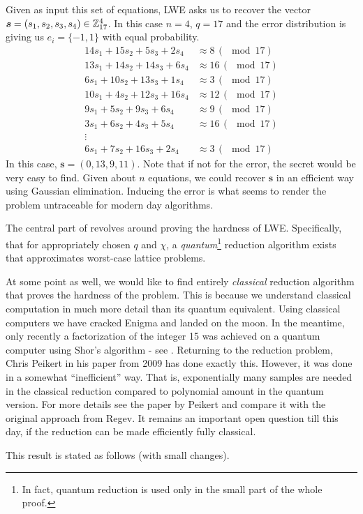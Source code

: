 \begin{example}\label{lwe_ex}
    Given as input this set of equations, LWE asks us to recover the vector $\boldsymbol{s} = (s_1, s_2, s_3, s_4) \in \mathbb{Z}_{17}^4$. In this case $n = 4$, $q=17$ and the error distribution is giving us $e_i = \{-1, 1\}$ with equal probability. 
\begin{align*}
    14s_1 + 15s_2 +5s_3 + 2s_4 & \approx 8 \, (\mod 17)\\
    13s_1 + 14s_2 + 14s_3 + 6s_4 & \approx 16\, (\mod 17) \\
    6s_1 + 10s_2 + 13s_3 + 1s_4 & \approx 3\, (\mod 17) \\
    10s_1 + 4s_2 + 12s_3 + 16s_4 & \approx 12\, (\mod 17) \\
    9s_1 + 5s_2 + 9s_3 +6s_4 & \approx 9\, (\mod 17) \\
    3s_1 + 6s_2 +4s_3 +5s_4 & \approx 16\, (\mod 17) \\
    \vdots & \\
    6s_1 + 7s_2 + 16s_3 + 2s_4 & \approx 3\, (\mod 17)
\end{align*}
In this case, $\bm{s} = (0, 13, 9, 11)$. Note that if not for the error, the secret would be very easy to find. Given about $n$ equations, we could recover $\bm{s}$ in an efficient way using Gaussian elimination. Inducing the error is what seems to render the problem untraceable for modern day algorithms.
\end{example}

The central part of \cite{regev} revolves around proving the hardness of LWE. Specifically, that for appropriately chosen $q$ and $\chi$, a \textit{quantum}\footnote{In fact, quantum reduction is used only in the small part of the whole proof.} reduction algorithm exists that approximates worst-case lattice problems. 
\\ 
\begin{remark}
    At some point as well, we would like to find entirely \textit{classical} reduction algorithm that proves the hardness of the problem. This is because we understand classical computation in much more detail than its quantum equivalent. Using classical computers we have cracked Enigma and landed on the moon. In the meantime, only recently a factorization of the integer 15 was achieved on a quantum computer using Shor's algorithm - see . Returning to the reduction problem, Chris Peikert in his paper \cite{peikert_classical} from 2009 has done exactly this. However, it was done in a somewhat ``inefficient'' way. That is, exponentially many samples are needed in the classical reduction compared to polynomial amount in the quantum version. For more details see the paper by Peikert and compare it with the original approach from Regev. It remains an important open question  till this day, if the reduction can be made efficiently fully classical.
\end{remark}
This result is stated as follows (with small changes).

